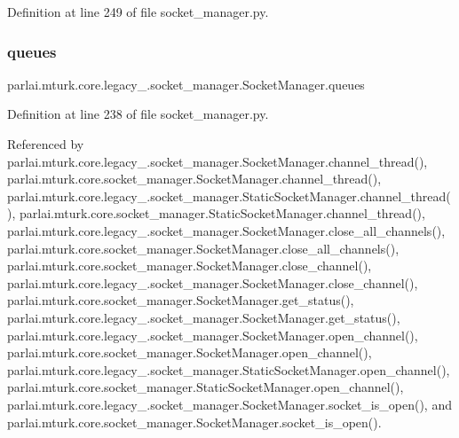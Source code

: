 Definition at line 249 of file socket\+\_\+manager.\+py.

\mbox{\label{classparlai_1_1mturk_1_1core_1_1legacy__2018_1_1socket__manager_1_1SocketManager_a53dd0c12c8301905c750d44c12e635b5}} 
\subsubsection{\texorpdfstring{queues}{queues}}
{\footnotesize\ttfamily parlai.\+mturk.\+core.\+legacy\+\_.\+socket\+\_\+manager.\+Socket\+Manager.\+queues}



Definition at line 238 of file socket\+\_\+manager.\+py.



Referenced by parlai.\+mturk.\+core.\+legacy\+\_.\+socket\+\_\+manager.\+Socket\+Manager.\+channel\+\_\+thread(), parlai.\+mturk.\+core.\+socket\+\_\+manager.\+Socket\+Manager.\+channel\+\_\+thread(), parlai.\+mturk.\+core.\+legacy\+\_.\+socket\+\_\+manager.\+Static\+Socket\+Manager.\+channel\+\_\+thread(), parlai.\+mturk.\+core.\+socket\+\_\+manager.\+Static\+Socket\+Manager.\+channel\+\_\+thread(), parlai.\+mturk.\+core.\+legacy\+\_.\+socket\+\_\+manager.\+Socket\+Manager.\+close\+\_\+all\+\_\+channels(), parlai.\+mturk.\+core.\+socket\+\_\+manager.\+Socket\+Manager.\+close\+\_\+all\+\_\+channels(), parlai.\+mturk.\+core.\+socket\+\_\+manager.\+Socket\+Manager.\+close\+\_\+channel(), parlai.\+mturk.\+core.\+legacy\+\_.\+socket\+\_\+manager.\+Socket\+Manager.\+close\+\_\+channel(), parlai.\+mturk.\+core.\+socket\+\_\+manager.\+Socket\+Manager.\+get\+\_\+status(), parlai.\+mturk.\+core.\+legacy\+\_.\+socket\+\_\+manager.\+Socket\+Manager.\+get\+\_\+status(), parlai.\+mturk.\+core.\+legacy\+\_.\+socket\+\_\+manager.\+Socket\+Manager.\+open\+\_\+channel(), parlai.\+mturk.\+core.\+socket\+\_\+manager.\+Socket\+Manager.\+open\+\_\+channel(), parlai.\+mturk.\+core.\+legacy\+\_.\+socket\+\_\+manager.\+Static\+Socket\+Manager.\+open\+\_\+channel(), parlai.\+mturk.\+core.\+socket\+\_\+manager.\+Static\+Socket\+Manager.\+open\+\_\+channel(), parlai.\+mturk.\+core.\+legacy\+\_.\+socket\+\_\+manager.\+Socket\+Manager.\+socket\+\_\+is\+\_\+open(), and parlai.\+mturk.\+core.\+socket\+\_\+manager.\+Socket\+Manager.\+socket\+\_\+is\+\_\+open().

